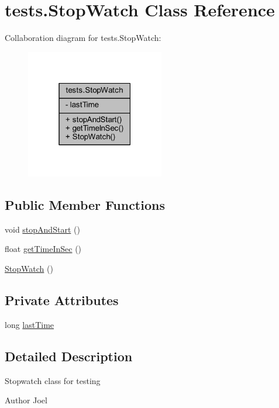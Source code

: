 \hypertarget{classtests_1_1_stop_watch}{}\section{tests.\+Stop\+Watch Class Reference}
\label{classtests_1_1_stop_watch}


Collaboration diagram for tests.\+Stop\+Watch\+:\nopagebreak
\begin{figure}[H]
\begin{center}
\leavevmode
\includegraphics[width=171pt]{classtests_1_1_stop_watch__coll__graph}
\end{center}
\end{figure}
\subsection*{Public Member Functions}
\begin{DoxyCompactItemize}
\item 
void \mbox{\hyperlink{classtests_1_1_stop_watch_a0e04959e839d96d5e64c51d7818455a2}{stop\+And\+Start}} ()
\item 
float \mbox{\hyperlink{classtests_1_1_stop_watch_a1603703f4833f56b1a7a3fa1fe1a5535}{get\+Time\+In\+Sec}} ()
\item 
\mbox{\hyperlink{classtests_1_1_stop_watch_a5aa96180c2b141e1970b29c4c52f0144}{Stop\+Watch}} ()
\end{DoxyCompactItemize}
\subsection*{Private Attributes}
\begin{DoxyCompactItemize}
\item 
long \mbox{\hyperlink{classtests_1_1_stop_watch_ae93f417b6d6f676582e08de8b15a0ab4}{last\+Time}}
\end{DoxyCompactItemize}


\subsection{Detailed Description}
Stopwatch class for testing \begin{DoxyAuthor}{Author}
Joel 
\end{DoxyAuthor}


